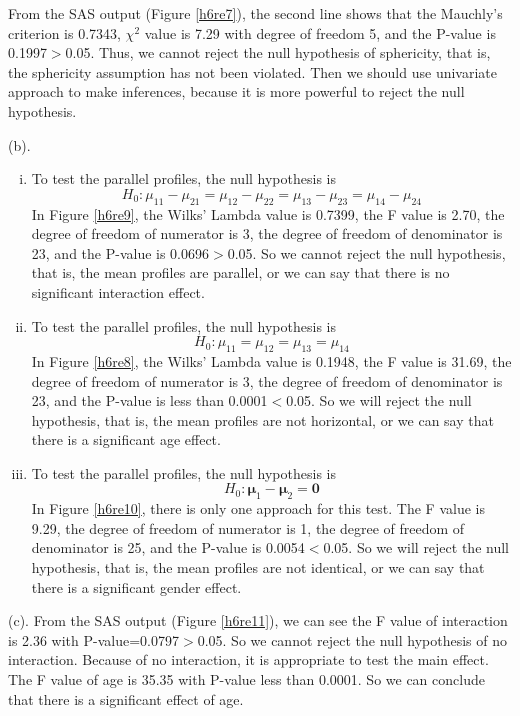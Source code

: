 \documentclass[letterpaper, 12pt]{article}
\begin{document}
From the SAS output (Figure \ref{h6re7}), the second line shows that the Mauchly's criterion is 0.7343, $\chi^2$ value is 7.29 with degree of freedom 5, and the P-value is 0.1997$>$0.05. Thus, we cannot reject the null hypothesis of sphericity, that is, the sphericity assumption has not been violated. Then we should use univariate approach to make inferences, because it is more powerful to reject the null hypothesis.
         


(b). \begin{enumerate}[(i).]
\item To test the parallel profiles, the null hypothesis is
$$
H_0: \mu_{11}-\mu_{21}=\mu_{12}-\mu_{22}=\mu_{13}-\mu_{23}=\mu_{14}-\mu_{24}
$$
In Figure \ref{h6re9}, the Wilks' Lambda value is 0.7399, the F value is 2.70, the degree of freedom of numerator is 3, the degree of freedom of denominator is 23, and the P-value is 0.0696$>$0.05. So we cannot reject the null hypothesis, that is, the mean profiles are parallel, or we can say that there is no significant interaction effect.
\item To test the parallel profiles, the null hypothesis is
$$
H_0: \mu_{11}=\mu_{12}=\mu_{13}=\mu_{14}
$$
In Figure \ref{h6re8}, the Wilks' Lambda value is 0.1948, the F value is 31.69, the degree of freedom of numerator is 3, the degree of freedom of denominator is 23, and the P-value is less than 0.0001$<$0.05. So we will reject the null hypothesis, that is, the mean profiles are not horizontal, or we can say that there is a significant age effect.
\item To test the parallel profiles, the null hypothesis is
$$
H_0: \bm{\mu}_1-\bm{\mu}_2=\bm{0}
$$
In Figure \ref{h6re10}, there is only one approach for this test. The F value is 9.29, the degree of freedom of numerator is 1, the degree of freedom of denominator is 25, and the P-value is 0.0054$<$0.05. So we will reject the null hypothesis, that is, the mean profiles are not identical, or we can say that there is a significant gender effect.
\end{enumerate}


(c). From the SAS output (Figure \ref{h6re11}), we can see the F value of interaction is 2.36 with P-value=0.0797$>$0.05. So we cannot reject the null hypothesis of no interaction. Because of no interaction, it is appropriate to test the main effect. The F value of age is 35.35 with P-value less than 0.0001. So we can conclude that there is a significant effect of age.
         
\end{document}
